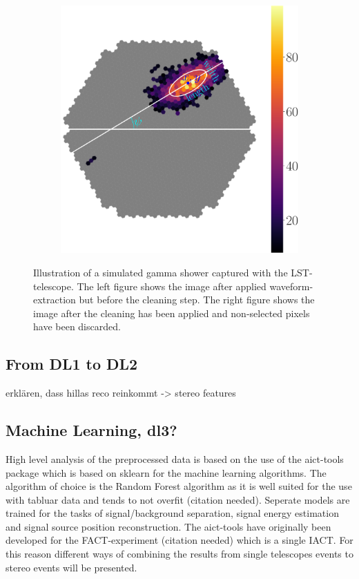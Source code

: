 \begin{figure}
\begin{subfigure}{0.3\textwidth}
        \label{fig:shower_image_cleaned}
    \end{subfigure}
    \begin{subfigure}{0.3\textwidth}
        \includegraphics[width=0.9\linewidth]{../Plots/hillas_cleaned_params.pdf} 
        \label{fig:hillas_parameters_only}
    \end{subfigure}
    \caption{Illustration of a simulated gamma shower captured with the LST-telescope.
        The left figure shows the image after applied waveform-extraction but before
        the cleaning step. The right figure shows the image after the cleaning has been applied
        and non-selected pixels have been discarded.}
    \label{fig:shower_image}
\end{figure}

\subsection{From DL1 to DL2}  %
erklären, dass hillas reco reinkommt -> stereo features

\subsection{Machine Learning, dl3?}
High level analysis of the preprocessed data is based on the use of
the aict-tools \cite{aict-tools} package which is based on
sklearn \cite{sklearn_api} for the machine learning algorithms.
The algorithm of choice is the Random Forest algorithm
as it is well suited for the use with tabluar data and tends to not overfit
(citation needed).
Seperate models are trained for the tasks of signal/background
separation, signal energy estimation and signal source position
reconstruction.
The aict-tools have originally been developed for the FACT-experiment
(citation needed) which is a single IACT. For this reason
different ways of combining the results from single telescopes events
to stereo events will be presented.


